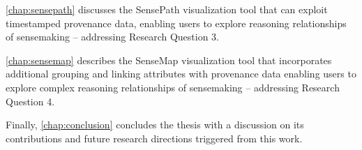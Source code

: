 \autoref{chap:sensepath} discusses the SensePath visualization tool that can exploit timestamped provenance data, enabling users to explore reasoning relationships of sensemaking -- addressing Research Question 3.

\autoref{chap:sensemap} describes the SenseMap visualization tool that incorporates additional grouping and linking attributes with provenance data enabling users to explore complex reasoning relationships of sensemaking -- addressing Research Question 4.

Finally, \autoref{chap:conclusion} concludes the thesis with a discussion on its contributions and future research directions triggered from this work.